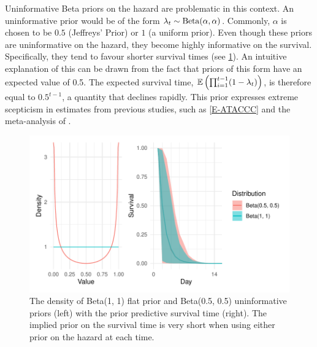 \documentclass[thesis.tex]{subfiles}
\begin{document}
Uninformative Beta priors on the hazard are problematic in this context.
An uninformative prior would be of the form $\lambda_t \sim \operatorname{Beta}(\alpha, \alpha)$.
Commonly, $\alpha$ is chosen to be $0.5$ (Jeffreys' Prior) or $1$ (a uniform prior).
Even though these priors are uninformative on the hazard, they become highly informative on the survival. 
Specifically, they tend to favour shorter survival times (see \cref{perf-test:fig:flat-prior}).
An intuitive explanation of this can be drawn from the fact that priors of this form have an expected value of 0.5.
The expected survival time, $\operatorname{\mathbb{E}} \left( \prod_{i=1}^{t-1} (1-\lambda_t) \right)$, is therefore equal to $0.5^{t-1}$, a quantity that declines rapidly.
This prior expresses extreme scepticism in estimates from previous studies, such as \cref{E-ATACCC} and the meta-analysis of \textcite{cevikShedding}.
\begin{figure}
  \centering \includegraphics{cis-perfect-testing/flat-prior}
  \caption[Uninformative priors for the hazard]{The density of Beta(1, 1) flat prior and Beta(0.5, 0.5) uninformative priors (left) with the prior predictive survival time (right). The implied prior on the survival time is very short when using either prior on the hazard at each time. \label{perf-test:fig:flat-prior}}
\end{figure}
\end{document}
